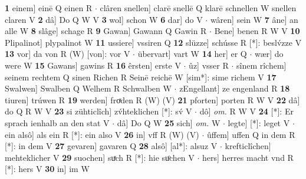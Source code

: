 \documentclass[8pt,a4paper,notitlepage]{article}
\begin{document}
\begin{table}[ht]
\begin{minipage}[t]{0.5\linewidth}
\textbf{1} einem] einē Q einen R  $\cdot$ clâren snellen] clarē snellē Q klarē schnellen W snellen claren V \textbf{2} dâ] Do Q W V \textbf{3} wol] schon W \textbf{6} dar] do V  $\cdot$ wâren] sein W \textbf{7} âne] an alle W \textbf{8} slâge] schage R \textbf{9} Gawan] Gawann Q Gawin R  $\cdot$ Bene] benen R W V \textbf{10} Plipalinot] plypalinot W \textbf{11} ussiere] vssiren Q \textbf{12} slüzze] schússe R [*]: beslv́zze V \textbf{13} vor] da von R (W) [von]: vor  V  $\cdot$ übervart] vart W \textbf{14} her] er Q  $\cdot$ wær] do were W \textbf{15} Gawans] gawins R \textbf{16} êrsten] erste V  $\cdot$ ûz] vsser R  $\cdot$ sînem rîchem] seinem rechtem Q sinen Richen R Seinē reichē W [sim*]: sime richem V \textbf{17} Swalwen] Swalben Q Welhem R Schwalben W  $\cdot$ zEngellant] ze engenland R \textbf{18} tiuren] trúwen R \textbf{19} werden] froͯden R (W) (V) \textbf{21} pforten] porten R W V \textbf{22} dâ] do Q R W V \textbf{23} si zühticlîch] zv́hteklichen [*]: sv́ V  $\cdot$ dô] \textit{om.} R W V \textbf{24} [*]: Er sprach ienhalb an den stat V  $\cdot$ dâ] Do Q W \textbf{25} sich] \textit{om.} W  $\cdot$ legte] [*]: leget V  $\cdot$ ein alsô] als ein R [*]: ein also V \textbf{26} in] vff R (W) (V)  $\cdot$ ûffem] uffen Q in dem R [*]: in dem V \textbf{27} gevaren] gavaren Q \textbf{28} alsô] [al*]: alsuz V  $\cdot$ krefticlîchen] mehteklicher V \textbf{29} suochen] suͯch R [*]: hie suͦchen V  $\cdot$ hers] herres macht vnd R [*]: hers V \textbf{30} in] im W \newline
\end{minipage}
\end{table}
\end{document}
